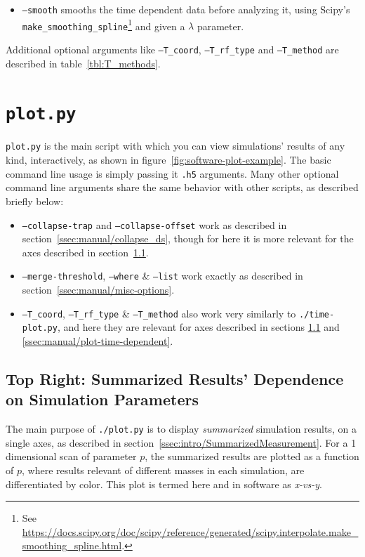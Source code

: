 \begin{itemize}
	\item \texttt{--smooth} smooths the time dependent data before analyzing it, using Scipy's \texttt{make\_smoothing\_spline}\footnote{See \url{https://docs.scipy.org/doc/scipy/reference/generated/scipy.interpolate.make_smoothing_spline.html}.} and given a $\lambda$ parameter.
\end{itemize}

Additional optional arguments like \texttt{--T\_coord}, \texttt{--T\_rf\_type} and \texttt{--T\_method} are described in table~\ref{tbl:T_methods}.

\section{\texttt{plot.py}}\label{sec:manual/plot}

\texttt{plot.py} is the main script with which you can view simulations' results of any kind, interactively, as shown in figure~\ref{fig:software-plot-example}. The basic command line usage is simply passing it \texttt{.h5} arguments. Many other optional command line arguments share the same behavior with other scripts, as described briefly below:

\begin{itemize}
	\item \texttt{--collapse-trap} and \texttt{--collapse-offset} work as described in section~\ref{ssec:manual/collapse_ds}, though for here it is more relevant for the axes described in section~\ref{ssec:manual/x-vs-y}.
	\item \texttt{--merge-threshold}, \texttt{--where} \& \texttt{--list} work exactly as described in section~\ref{ssec:manual/misc-options}.
	\item \texttt{--T\_coord}, \texttt{--T\_rf\_type} \& \texttt{--T\_method} also work very similarly to \texttt{./time-plot.py}, and here they are relevant for axes described in sections \ref{ssec:manual/x-vs-y} and \ref{ssec:manual/plot-time-dependent}.
\end{itemize}

\subsection{Top Right: Summarized Results' Dependence on Simulation Parameters}\label{ssec:manual/x-vs-y}

The main purpose of \texttt{./plot.py} is to display \textit{summarized} simulation results, on a single axes, as described in section~\ref{ssec:intro/SummarizedMeasurement}. For a 1 dimensional scan of parameter $p$, the summarized results are plotted as a function of $p$, where results relevant of different masses in each simulation, are differentiated by color. This plot is termed here and in software as \textit{x-vs-y}.

